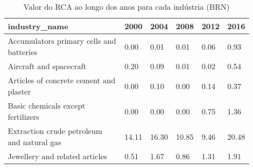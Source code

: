 \begin{table}
\centering
\caption{Valor do RCA ao longo dos anos para cada indústria (BRN)}
\begin{tabular}{p{6cm}p{1.5cm}p{1.5cm}p{1.5cm}p{1.5cm}p{1.5cm}}
\toprule
                             industry\_name &  2000 &  2004 &  2008 & 2012 &  2016 \\
\midrule
  Accumulators primary cells and batteries &  0.00 &  0.01 &  0.01 & 0.06 &  0.93 \\
                   Aircraft and spacecraft &  0.20 &  0.09 &  0.01 & 0.02 &  0.54 \\
   Articles of concrete cement and plaster &  0.00 &  0.10 &  0.00 & 0.14 &  0.37 \\
        Basic chemicals except fertilizers &  0.00 &  0.00 &  0.00 & 0.75 &  1.36 \\
Extraction crude petroleum and natural gas & 14.11 & 16.30 & 10.85 & 9.46 & 20.48 \\
            Jewellery and related articles &  0.51 &  1.67 &  0.86 & 1.31 &  1.91 \\
\bottomrule
\end{tabular}
\end{table}
